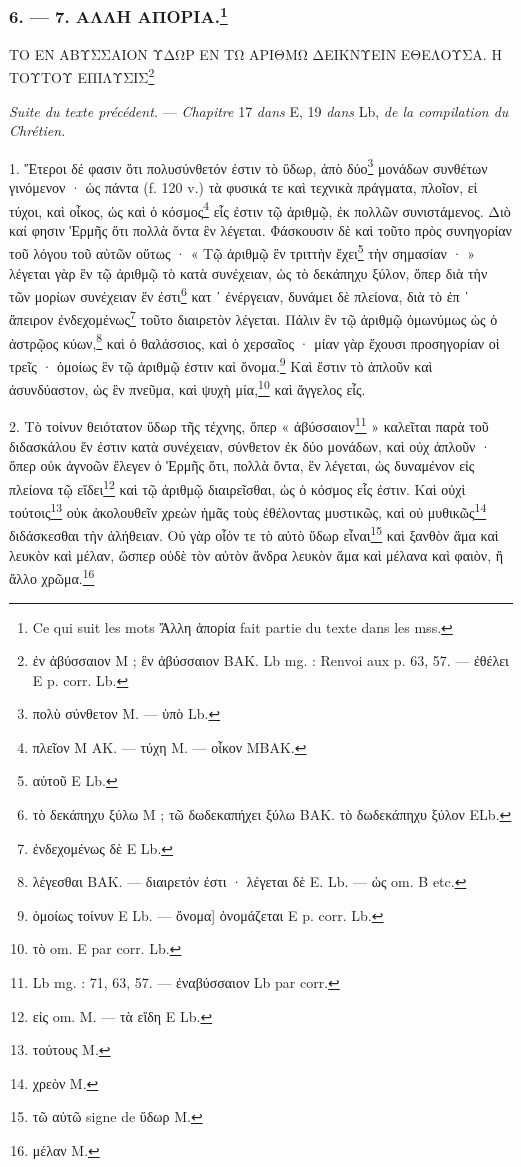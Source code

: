 \documentclass[a4paper, 11pt, oneside, polutonikogreek, french]{article}
\begin{document}
\bigskip
\centerline{\EightStarTaper}
\centerline{\EightStarTaper\EightStarTaper}
\bigskip

\subsubsection[6. --- 7. ΑΛΛΗ ΑΠΟΡΙΑ.]{6. --- 7. ΑΛΛΗ ΑΠΟΡΙΑ.\footnote{Ce qui suit les mots Ἄλλη ἀπορία fait partie du texte dans les mss.}}

ΤΟ ΕΝ ΑΒΥΣΣΑΙΟΝ ΥΔΩΡ ΕΝ ΤΩ ΑΡΙΘΜΩ ΔΕΙΚΝΥΕΙΝ ΕΘΕΛΟΥΣΑ. Η ΤΟΥΤΟΥ ΕΠΙΛΥΣΙΣ\footnote{ἐν ἀβύσσαιον M ; ἓν ἀβύσσαιον BAK. Lb mg. : Renvoi aux p. 63, 57. --- ἐθέλει E p. corr. Lb.}

\emph{Suite du texte précédent.} --- \emph{Chapitre} 17 \emph{dans} E, 19 \emph{dans} Lb, \emph{de la compilation du Chrétien.}

1. Ἕτεροι δέ φασιν ὅτι πολυσύνθετόν ἐστιν τὸ ὕδωρ, ἀπὸ δύο\footnote{πολὺ σύνθετον M. --- ὑπὸ Lb.} μονάδων συνθέτων γινόμενον · ὡς πάντα (f. 120 v.) τὰ φυσικά τε καὶ τεχνικὰ πράγματα, πλοῖον, εἰ τύχοι, καὶ οἶκος, ὡς καὶ ὁ κόσμος\footnote{πλεῖον M AK. --- τύχη M. --- οἶκον MBAK.} εἷς ἐστιν τῷ ἀριθμῷ, ἐκ πολλῶν συνιστάμενος. Διὸ καί φησιν Ἑρμῆς ὅτι πολλὰ ὄντα ἓν λέγεται. Φάσκουσιν δὲ καὶ τοῦτο πρὸς συνηγορίαν τοῦ λόγου τοῦ αὐτῶν οὕτως · « Τῷ ἀριθμῷ ἓν τριττὴν ἔχει\footnote{αὐτοῦ E Lb.} τὴν σημασίαν · » λέγεται γὰρ ἓν τῷ ἀριθμῷ τὸ κατὰ συνέχειαν, ὡς τὸ δεκάπηχυ ξύλον, ὅπερ διὰ τὴν τῶν μορίων συνέχειαν ἕν ἐστι\footnote{τὸ δεκάπηχυ ξύλω M ; τῶ δωδεκαπήχει ξύλω BAK. τὸ δωδεκάπηχυ ξύλον ELb.} κατ ᾽ ἐνέργειαν, δυνάμει δὲ πλείονα, διὰ τὸ ἐπ ᾽ ἄπειρον ἐνδεχομένως\footnote{ἐνδεχομένως δὲ E Lb.} τοῦτο διαιρετὸν λέγεται. Πάλιν ἓν τῷ ἀριθμῷ ὁμωνύμως ὡς ὁ ἀστρῷος κύων,\footnote{λέγεσθαι BAK. --- διαιρετόν ἐστι · λέγεται δὲ E. Lb. --- ὡς om. B etc.} καὶ ὁ θαλάσσιος, καὶ ὁ χερσαῖος · μίαν γὰρ ἔχουσι προσηγορίαν οἱ τρεῖς · ὁμοίως ἓν τῷ ἀριθμῷ ἐστιν καὶ ὄνομα.\footnote{ὁμοίως τοίνυν E Lb. --- ὄνομα] ὀνομάζεται E p. corr. Lb.} Καὶ ἔστιν τὸ ἁπλοῦν καὶ ἀσυνδύαστον, ὡς ἓν πνεῦμα, καὶ ψυχὴ μία,\footnote{τὸ om. E par corr. Lb.} καὶ ἄγγελος εἷς.

2. Τὸ τοίνυν θειότατον ὕδωρ τῆς τέχνης, ὅπερ « ἀβύσσαιον\footnote{Lb mg. : 71, 63, 57. --- ἐναβύσσαιον Lb par corr.} » καλεῖται παρὰ τοῦ διδασκάλου ἕν ἐστιν κατὰ συνέχειαν, σύνθετον ἐκ δύο μονάδων, καὶ οὐχ ἁπλοῦν · ὅπερ οὐκ ἀγνοῶν ἔλεγεν ὁ Ἑρμῆς ὅτι, πολλὰ ὄντα, ἓν λέγεται, ὡς δυναμένον εἰς πλείονα τῷ εἴδει\footnote{εἰς om. M. --- τὰ εἴδη E Lb.} καὶ τῷ ἀριθμῷ διαιρεῖσθαι, ὡς ὁ κόσμος εἷς ἐστιν. Καὶ οὐχὶ τούτοις\footnote{τούτους M.} οὐκ ἀκολουθεῖν χρεὼν ἡμᾶς τοὺς ἐθέλοντας μυστικῶς, καὶ οὐ μυθικῶς\footnote{χρεὸν M.} διδάσκεσθαι τὴν ἀλήθειαν. Οὐ γὰρ οἷόν τε τὸ αὐτὸ ὕδωρ εἶναι\footnote{τῶ αὐτῶ signe de ὕδωρ M.} καὶ ξανθὸν ἅμα καὶ λευκὸν καὶ μέλαν, ὥσπερ οὐδὲ τὸν αὐτὸν ἄνδρα λευκὸν ἅμα καὶ μέλανα καὶ φαιὸν, ἢ ἄλλο χρῶμα.\footnote{μέλαν M.}
\end{document}
